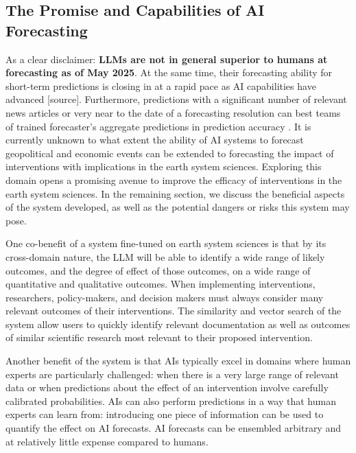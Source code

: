 \documentclass[12pt,a4paper]{article}
\begin{document}
\subsection{The Promise and Capabilities of AI Forecasting}

As a clear disclaimer: \textbf{LLMs are not in general superior to humans at forecasting as of May 2025}. At the same time, their forecasting ability for short-term predictions is closing in at a rapid pace as AI capabilities have advanced [source]. Furthermore, predictions with a significant number of relevant news articles or very near to the date of a forecasting resolution can best teams of trained forecaster's aggregate predictions in prediction accuracy . It is currently unknown to what extent the ability of AI systems to forecast geopolitical and economic events can be extended to forecasting the impact of interventions with implications in the earth system sciences. Exploring this domain opens a promising avenue to improve the efficacy of interventions in the earth system sciences. In the remaining section, we discuss the beneficial aspects of the system developed, as well as the potential dangers or risks this system may pose.

One co-benefit of a system fine-tuned on earth system sciences is that by its cross-domain nature, the LLM will be able to identify a wide range of likely outcomes, and the degree of effect of those outcomes, on a wide range of quantitative and qualitative outcomes. When implementing interventions, researchers, policy-makers, and decision makers must always consider many relevant outcomes of their interventions. The similarity and vector search of the system allow users to quickly identify relevant documentation as well as outcomes of similar scientific research most relevant to their proposed intervention.

Another benefit of the system is that AIs typically excel in domains where human experts are particularly challenged: when there is a very large range of relevant data or when predictions about the effect of an intervention involve carefully calibrated probabilities. AIs can also perform predictions in a way that human experts can learn from: introducing one piece of information can be used to quantify the effect on AI forecasts. AI forecasts can be ensembled arbitrary and at relatively little expense compared to humans. 
\end{document}

